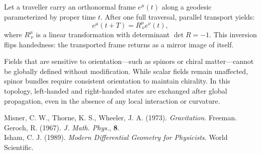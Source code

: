 \begin{technical}
Let a traveller carry an orthonormal frame \(e^\mu(t)\) along a geodesic parameterized by proper time \(t\). After one full traversal, parallel transport yields:
\[
e^\mu(t + T) = R^\mu_{\ \nu} e^\nu(t),
\]
where \(R^\mu_{\ \nu}\) is a linear transformation with determinant \(\det R = -1\). This inversion flips handedness: the transported frame returns as a mirror image of itself.

Fields that are sensitive to orientation—such as spinors or chiral matter—cannot be globally defined without modification. While scalar fields remain unaffected, spinor bundles require consistent orientation to maintain chirality. In this topology, left-handed and right-handed states are exchanged after global propagation, even in the absence of any local interaction or curvature.

\techref
{\footnotesize
Misner, C. W., Thorne, K. S., Wheeler, J. A. (1973). \textit{Gravitation}. Freeman.\\
Geroch, R. (1967). \textit{J. Math. Phys.}, \textbf{8}.\\
Isham, C. J. (1989). \textit{Modern Differential Geometry for Physicists}. World Scientific.
}
\end{technical}
